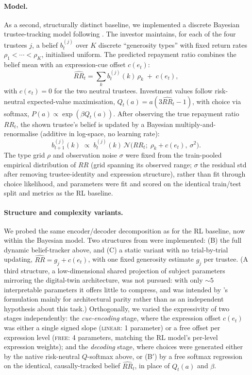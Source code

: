 \documentclass[11pt]{article}
\begin{document}
\paragraph{Model.}
As a second, structurally distinct baseline, we implemented a discrete
Bayesian trustee-tracking model following \citet{Ray2008}. The investor
maintains, for each of the four trustees $j$, a belief $b_t^{(j)}$ over $K$
discrete ``generosity types'' with fixed return rates $\rho_1 < \cdots <
\rho_K$, initialised uniform. The predicted repayment ratio combines the
belief mean with an expression-cue offset $c(e_t)$:
\begin{equation}
  \widehat{RR}_t = \sum_k b_t^{(j)}(k)\,\rho_k \;+\; c(e_t),
\end{equation}
with $c(e_t)=0$ for the two neutral trustees. Investment values follow
risk-neutral expected-value maximisation, $Q_t(a) = a(3\widehat{RR}_t -
1)$, with choice via softmax, $P(a)\propto\exp(\beta Q_t(a))$. After
observing the true repayment ratio $RR_t$, the shown trustee's belief is
updated by a Bayesian multiply-and-renormalise (additive in log-space, no
learning rate):
\begin{equation}
  b_{t+1}^{(j)}(k) \;\propto\; b_t^{(j)}(k)\,
  \mathcal{N}\!\big(RR_t;\; \rho_k + c(e_t),\ \sigma^2\big).
\end{equation}
The type grid $\rho$ and observation noise $\sigma$ were fixed from the
train-pooled empirical distribution of $RR$ (grid spanning its observed
range; $\sigma$ the residual std after removing trustee-identity and
expression structure), rather than fit through choice likelihood, and
parameters were fit and scored on the identical train/test split and
metrics as the RL baseline.

\paragraph{Structure and complexity variants.}
We probed the same encoder/decoder decomposition as for the RL baseline,
now within the Bayesian model. Two structures from \citet{Ray2008} were
implemented: (B) the full dynamic belief-tracker above, and (C) a static
variant with no trial-by-trial updating, $\widehat{RR} = g_j + c(e_t)$,
with one fixed generosity estimate $g_j$ per trustee. (A third structure,
a low-dimensional shared projection of subject parameters mirroring the
digital-twin architecture, was not pursued: with only $\sim\!5$
interpretable parameters it offers little to compress, and was intended by
\citet{Ray2008}'s formulation mainly for architectural parity rather than
as an independent hypothesis about this task.) Orthogonally, we varied the
expressivity of two stages independently: the \emph{cue-encoding} stage,
where the expression offset $c(e_t)$ was either a single signed slope
(\textsc{linear}: 1 parameter) or a free offset per expression level
(\textsc{free}: 4 parameters, matching the RL model's per-level expression
weights); and the \emph{decoding} stage, where choices were generated
either by the native risk-neutral $Q$-softmax above, or (B$'$) by a free
softmax regression on the identical, causally-tracked belief
$\widehat{RR}_t$, in place of $Q_t(a)$ and $\beta$.
\end{document}
